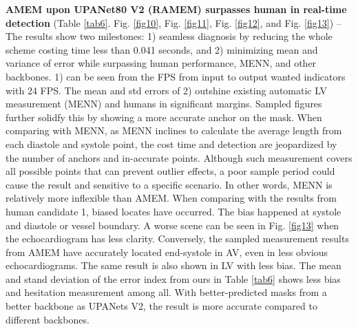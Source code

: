 \documentclass{article}
\begin{document}
\textbf{AMEM upon UPANet80 V2 (RAMEM) surpasses human in real-time detection} (Table \ref{tab6}. Fig. \ref{fig10}, Fig. \ref{fig11}, Fig. \ref{fig12}, and Fig. \ref{fig13}) – The results show two milestones: 1) seamless diagnosis  by reducing the whole scheme costing time less than 0.041 seconds, and 2) minimizing mean and variance of error while surpassing human performance, MENN, and other backbones. 1) can be seen from the FPS from input to output wanted indicators with 24 FPS. The mean and std errors of 2) outshine existing automatic LV measurement (MENN) and humans in significant margins. Sampled figures further solidfy this by showing a more accurate anchor on the mask. When comparing with MENN, as MENN inclines to calculate the average length from each diastole and systole point, the cost time and detection are jeopardized by the number of anchors and in-accurate points. Although such measurement covers all possible points that can prevent outlier effects, a poor sample period could cause the result and sensitive to a specific scenario. In other words, MENN is relatively more inflexible than AMEM. When comparing with the results from human candidate 1, biased locates have occurred. The bias happened at systole and diastole or vessel boundary. A worse scene can be seen in Fig. \ref{fig13} when the echocardiogram has less clarity. Conversely, the sampled measurement results from AMEM have accurately located end-systole in AV, even in less obvious echocardiograms. The same result is also shown in LV with less bias. The mean and stand deviation of the error index from ours in Table \ref{tab6} shows less bias and hesitation measurement among all. With better-predicted masks from a better backbone as UPANets V2, the result is more accurate compared to different backbones.
\end{document}
